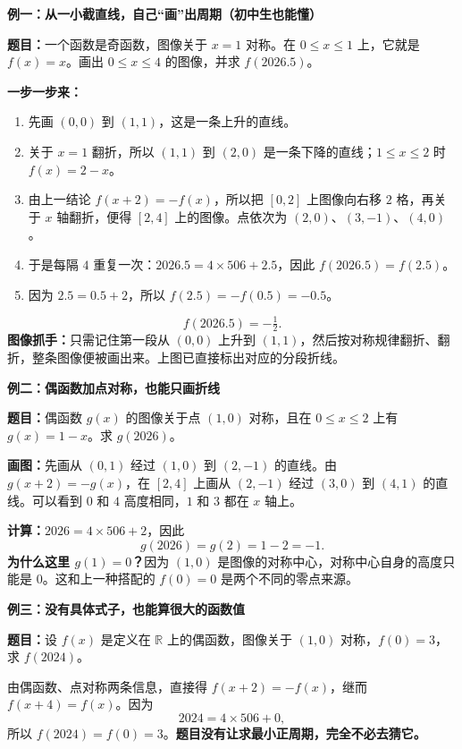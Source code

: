\clearpage
\begin{examplebox}
\textbf{\textcolor{CExample}{例一：从一小截直线，自己“画”出周期（初中生也能懂）}}



\textbf{题目：}一个函数是奇函数，图像关于 $x=1$ 对称。在 $0\le x\le1$ 上，它就是 $f(x)=x$。画出 $0\le x\le4$ 的图像，并求 $f(2026.5)$。

\textbf{一步一步来：}
\begin{enumerate}[leftmargin=*,itemsep=0.3em]
 \item 先画 $(0,0)$ 到 $(1,1)$，这是一条上升的直线。
 \item 关于 $x=1$ 翻折，所以 $(1,1)$ 到 $(2,0)$ 是一条下降的直线；$1\le x\le2$ 时 $f(x)=2-x$。
 \item 由上一结论 $f(x+2)=-f(x)$，所以把 $[0,2]$ 上图像向右移 $2$ 格，再关于 $x$ 轴翻折，便得 $[2,4]$ 上的图像。点依次为 $(2,0)$、$(3,-1)$、$(4,0)$。
 \item 于是每隔 $4$ 重复一次：$2026.5=4\times506+2.5$，因此 $f(2026.5)=f(2.5)$。
 \item 因为 $2.5=0.5+2$，所以 $f(2.5)=-f(0.5)=-0.5$。
\end{enumerate}
\[
\boxed{f(2026.5)=-\tfrac12}.
\]
\textbf{图像抓手：}只需记住第一段从 $(0,0)$ 上升到 $(1,1)$，然后按对称规律翻折、翻折，整条图像便被画出来。上图已直接标出对应的分段折线。

\medskip

\end{examplebox}
\clearpage
\begin{examplebox}
\textbf{\textcolor{CExample}{例二：偶函数加点对称，也能只画折线}}



\textbf{题目：}偶函数 $g(x)$ 的图像关于点 $(1,0)$ 对称，且在 $0\le x\le2$ 上有 $g(x)=1-x$。求 $g(2026)$。

\textbf{画图：}先画从 $(0,1)$ 经过 $(1,0)$ 到 $(2,-1)$ 的直线。由 $g(x+2)=-g(x)$，在 $[2,4]$ 上画从 $(2,-1)$ 经过 $(3,0)$ 到 $(4,1)$ 的直线。可以看到 $0$ 和 $4$ 高度相同，$1$ 和 $3$ 都在 $x$ 轴上。

\textbf{计算：}$2026=4\times506+2$，因此
\[
g(2026)=g(2)=1-2=\boxed{-1}.
\]
\textbf{为什么这里 $g(1)=0$？}因为 $(1,0)$ 是图像的对称中心，对称中心自身的高度只能是 $0$。这和上一种搭配的 $f(0)=0$ 是两个不同的零点来源。

\medskip

\end{examplebox}
\clearpage
\begin{examplebox}
\textbf{\textcolor{CExample}{例三：没有具体式子，也能算很大的函数值}}



\textbf{题目：}设 $f(x)$ 是定义在 $\mathbb{R}$ 上的偶函数，图像关于 $(1,0)$ 对称，$f(0)=3$，求 $f(2024)$。

由偶函数、点对称两条信息，直接得 $f(x+2)=-f(x)$，继而 $f(x+4)=f(x)$。因为
\[
2024=4\times506+0,
\]
所以 $f(2024)=f(0)=\boxed{3}$。\textbf{题目没有让求最小正周期，完全不必去猜它。}

\medskip

\end{examplebox}

